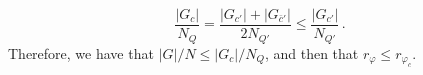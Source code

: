 \begin{equation}
\frac{\lvert G_{c} \rvert }{N_{Q}} = \frac{\lvert G_{c'} \rvert + \lvert G_{\bar{c}'} \rvert }{2N_{Q'} } \leq \frac{\lvert G_{c'} \rvert }{N_{Q'}} \,.
\end{equation}
Therefore, we have that $\lvert G \rvert / N \leq \lvert G_{c} \rvert / N_{Q}$, and then that $r_{\varphi} \leq r_{\varphi_{c}}$.

